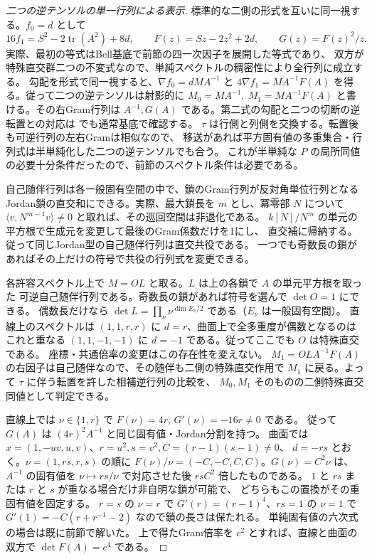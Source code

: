\begin{proof}[二つの逆テンソルの単一行列による表示]
標準的な二側の形式を互いに同一視する。$f_0=d$ として
\[
 16 f_1=S^2-2\operatorname{tr}(A^2)+8d,\qquad
 F(z)=Sz-2z^2+2d,\qquad G(z)=F(z)^2/z .
\]
実際、最初の等式はBell基底で前節の四一次因子を展開した等式であり、
双方が特殊直交群二つの不変式なので、単純スペクトルの稠密性により全行列に成立する。
勾配を形式で同一視すると、$\nabla f_0=d M A^{-1}$ と
$4\nabla f_1=M A^{-1}F(A)$ を得る。従って二つの逆テンソルは射影的に
$M_0=M A^{-1},\ M_1=M A^{-1}F(A)$ と書ける。その右Gram行列は
$A^{-1},G(A)$ である。第二式の勾配と二つの切断の逆転置との対応は
 でも通常基底で確認する。
$\tau$ は行側と列側を交換する。転置後も可逆行列の左右Gramは相似なので、
移送があれば平方固有値の多重集合・行列式は半単純化した二つの逆テンソルでも合う。
これが半単純な $P$ の局所同値の必要十分条件だったので、前節のスペクトル条件は必要である。

自己随伴行列は各一般固有空間の中で、鎖のGram行列が反対角単位行列となる
Jordan鎖の直交和にできる。実際、最大鎖長を $m$ とし、冪零部 $N$ について
$\langle v,N^{m-1}v\rangle\ne0$ と取れば、その巡回空間は非退化である。
$k[N]/N^m$ の単元の平方根で生成元を変更して最後のGram係数だけを1にし、
直交補に帰納する。従って同じJordan型の自己随伴行列は直交共役である。
一つでも奇数長の鎖があればその上だけの符号で共役の行列式を変更できる。

各許容スペクトル上で $M=O L$ と取る。$L$ は上の各鎖で $A$ の単元平方根を取った
可逆自己随伴行列である。奇数長の鎖があれば符号を選んで $\det O=1$ にできる。
偶数長だけなら $\det L=\prod_\nu\nu^{\dim E_\nu/2}$ である（$E_\nu$ は一般固有空間）。
直線上のスペクトルは $(1,1,r,r)$ に $d=r$、曲面上で全多重度が偶数となるのは
これと重なる $(1,1,-1,-1)$ に $d=-1$ である。従ってここでも $O$ は特殊直交である。
座標・共通倍率の変更はこの存在性を変えない。
$M_1=O L A^{-1}F(A)$ の右因子は自己随伴なので、その随伴も二側の特殊直交作用で
$M_1$ に戻る。よって $\tau$ に伴う転置を許した相補逆行列の比較を、
$M_0,M_1$ そのものの二側特殊直交同値として判定できる。

直線上では $\nu\in\{1,r\}$ で $F(\nu)=4r$, $G'(\nu)=-16r\ne0$ である。
従って $G(A)$ は $(4r)^2 A^{-1}$ と同じ固有値・Jordan分割を持つ。
曲面では $x=(1,-uv,u,v)$、$r=u^2,s=v^2,C=(r-1)(s-1)\ne0$、
$d=-rs$ とおく。$\nu=(1,rs,r,s)$ の順に
$F(\nu)/\nu=(-C,-C,C,C)$。$G(\nu)=C^2\nu$ は、$A^{-1}$ の固有値を
$\nu\mapsto rs/\nu$ で対応させた後 $rsC^2$ 倍したものである。
$1$ と $rs$ または $r$ と $s$ が重なる場合だけ非自明な鎖が可能で、
どちらもこの置換がその重固有値を固定する。
$r=s$ の $\nu=r$ で $G'(r)=(r-1)^4$、$rs=1$ の $\nu=1$ で
$G'(1)=-C(r+r^{-1}-2)$ なので鎖の長さは保たれる。
単純固有値の六次式の場合は既に前節で解いた。
上で得たGram倍率を $c^2$ とすれば、直線と曲面の双方で $\det F(A)=c^4$ である。


\end{proof}
